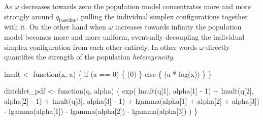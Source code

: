 \documentclass[
  letterpaper,
  DIV=11,
  numbers=noendperiod]{scrartcl}
\newenvironment{Shaded}{\begin{snugshade}}{\end{snugshade}}
\newcommand{\ControlFlowTok}[1]{\textcolor[rgb]{0.00,0.23,0.31}{#1}}
\newcommand{\DecValTok}[1]{\textcolor[rgb]{0.68,0.00,0.00}{#1}}
\newcommand{\FunctionTok}[1]{\textcolor[rgb]{0.28,0.35,0.67}{#1}}
\newcommand{\NormalTok}[1]{\textcolor[rgb]{0.00,0.23,0.31}{#1}}
\newcommand{\OtherTok}[1]{\textcolor[rgb]{0.00,0.23,0.31}{#1}}
\newcommand{\SpecialCharTok}[1]{\textcolor[rgb]{0.37,0.37,0.37}{#1}}
\begin{document}
As \(\omega\) decreases towards zero the population model concentrates
more and more strongly around \(q_{\mathrm{baseline}}\), pulling the
individual simplex configurations together with it. On the other hand
when \(\omega\) increases towards infinity the population model becomes
more and more uniform, eventually decoupling the individual simplex
configuration from each other entirely. In other words \(\omega\)
directly quantifies the strength of the population \emph{heterogeneity}.

\begin{Shaded}
\begin{Highlighting}[]
\NormalTok{lmult }\OtherTok{\textless{}{-}} \ControlFlowTok{function}\NormalTok{(x, a) \{}
  \ControlFlowTok{if}\NormalTok{ (a }\SpecialCharTok{==} \DecValTok{0}\NormalTok{) \{}
\NormalTok{    (}\DecValTok{0}\NormalTok{)}
\NormalTok{  \} }\ControlFlowTok{else}\NormalTok{ \{}
\NormalTok{    (a }\SpecialCharTok{*} \FunctionTok{log}\NormalTok{(x))}
\NormalTok{  \}}
\NormalTok{\}}

\NormalTok{dirichlet\_pdf }\OtherTok{\textless{}{-}} \ControlFlowTok{function}\NormalTok{(q, alpha) \{}
  \FunctionTok{exp}\NormalTok{(  }\FunctionTok{lmult}\NormalTok{(q[}\DecValTok{1}\NormalTok{], alpha[}\DecValTok{1}\NormalTok{] }\SpecialCharTok{{-}} \DecValTok{1}\NormalTok{)}
        \SpecialCharTok{+} \FunctionTok{lmult}\NormalTok{(q[}\DecValTok{2}\NormalTok{], alpha[}\DecValTok{2}\NormalTok{] }\SpecialCharTok{{-}} \DecValTok{1}\NormalTok{)}
        \SpecialCharTok{+} \FunctionTok{lmult}\NormalTok{(q[}\DecValTok{3}\NormalTok{], alpha[}\DecValTok{3}\NormalTok{] }\SpecialCharTok{{-}} \DecValTok{1}\NormalTok{)}
        \SpecialCharTok{+} \FunctionTok{lgamma}\NormalTok{(alpha[}\DecValTok{1}\NormalTok{] }\SpecialCharTok{+}\NormalTok{ alpha[}\DecValTok{2}\NormalTok{] }\SpecialCharTok{+}\NormalTok{ alpha[}\DecValTok{3}\NormalTok{])}
        \SpecialCharTok{{-}} \FunctionTok{lgamma}\NormalTok{(alpha[}\DecValTok{1}\NormalTok{]) }\SpecialCharTok{{-}} \FunctionTok{lgamma}\NormalTok{(alpha[}\DecValTok{2}\NormalTok{]) }\SpecialCharTok{{-}} \FunctionTok{lgamma}\NormalTok{(alpha[}\DecValTok{3}\NormalTok{]) )}
\NormalTok{\}}
\end{Highlighting}
\end{Shaded}
\end{document}

